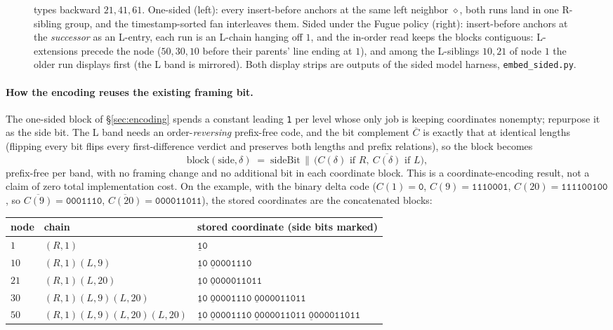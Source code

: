 \documentclass[11pt]{article}
\newcommand{\code}[1]{\texttt{#1}}
\begin{document}
\begin{figure}[h]
{types backward $21, 41, 61$. One-sided (left): every insert-before
anchors at the same left neighbor $\diamond$, both runs land in one
R-sibling group, and the timestamp-sorted fan interleaves them. Sided
under the Fugue policy (right): insert-before anchors at the
\emph{successor} as an L-entry, each run is an L-chain hanging off
$1$, and the in-order read keeps the blocks contiguous: L-extensions
precede the node ($50, 30, 10$ before their parents' line ending at
$1$), and among the L-siblings $10, 21$ of node $1$ the older run
displays first (the L band is mirrored). Both display strips are
outputs of the sided model harness, \code{embed\_sided.py}.}
\label{fig:sided-l19}
\end{figure}

\paragraph{How the encoding reuses the existing framing bit.} The
one-sided block of \S\ref{sec:encoding} spends a constant leading
\code{1} per level whose only job is keeping coordinates nonempty;
repurpose it as the side bit. The L band needs an
order-\emph{reversing} prefix-free code, and the bit complement
$\overline{C}$ is exactly that at identical lengths (flipping every
bit flips every first-difference verdict and preserves both lengths
and prefix relations), so the block becomes
\[
  \mathrm{block}(\mathrm{side}, \delta) \;=\; \mathrm{sideBit}
  \,\|\, \bigl(C(\delta) \text{ if } R,\ \overline{C(\delta)}
  \text{ if } L\bigr),
\]
prefix-free per band, with no framing change and no additional bit in
each coordinate block. This is a coordinate-encoding result, not a claim
of zero total implementation cost. On the
example, with the binary delta code ($C(1) = \code{0}$, $C(9) =
\code{1110001}$, $C(20) = \code{111100100}$, so $\overline{C(9)} =
\code{0001110}$, $\overline{C(20)} = \code{000011011}$), the stored
coordinates are the concatenated blocks:
\begin{center}\small
\begin{tabular}{@{}lll@{}}
\toprule
node & chain & stored coordinate (side bits marked) \\
\midrule
$1$  & $(R,1)$ &
  $\underline{\code{1}}\code{0}$ \\
$10$ & $(R,1)(L,9)$ &
  $\underline{\code{1}}\code{0}\;\underline{\code{0}}\code{0001110}$ \\
$21$ & $(R,1)(L,20)$ &
  $\underline{\code{1}}\code{0}\;\underline{\code{0}}\code{000011011}$ \\
$30$ & $(R,1)(L,9)(L,20)$ &
  $\underline{\code{1}}\code{0}\;\underline{\code{0}}\code{0001110}\;
   \underline{\code{0}}\code{000011011}$ \\
$50$ & $(R,1)(L,9)(L,20)(L,20)$ &
  $\underline{\code{1}}\code{0}\;\underline{\code{0}}\code{0001110}\;
   \underline{\code{0}}\code{000011011}\;
   \underline{\code{0}}\code{000011011}$ \\
\bottomrule
\end{tabular}
\end{center}
\end{document}
